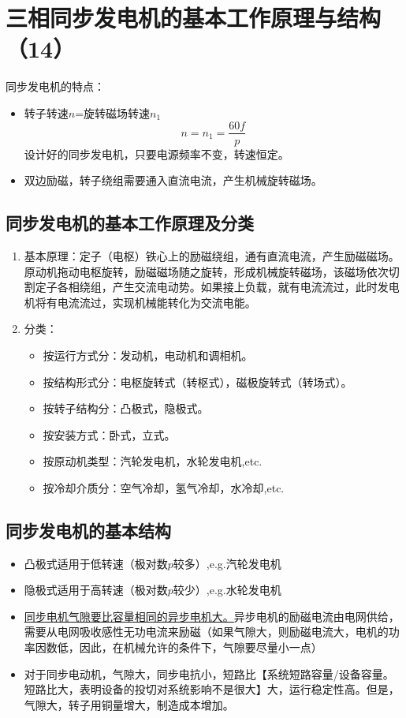 \documentclass[blue]{elegantnote}
\begin{document}
\chapter{三相同步发电机的基本工作原理与结构（14）}
同步发电机的特点：
\begin{itemize}
	\item  转子转速$n$=旋转磁场转速$n_1$
	$$n=n_1=\frac{60f}{p}$$
	设计好的同步发电机，只要电源频率不变，转速恒定。
	\item  {\color{thid}双边励磁}，转子绕组需要通入直流电流，产生机械旋转磁场。
\end{itemize}
\section{同步发电机的基本工作原理及分类}	
\begin{enumerate}
	\item 基本原理：{\color{blue}定子（电枢）}铁心上的励磁绕组，通有直流电流，产生励磁磁场。原动机拖动电枢旋转，励磁磁场随之旋转，形成机械旋转磁场，该磁场依次切割定子各相绕组，产生交流电动势。如果接上负载，就有电流流过，此时发电机将有电流流过，实现机械能转化为交流电能。
	\item 分类：
	\begin{itemize}
		\item 按运行方式分：发动机，电动机和调相机。
		\item 按结构形式分：电枢旋转式（转枢式），磁极旋转式（转场式）。
		\item 按转子结构分：凸极式，隐极式。
		\item 按安装方式：卧式，立式。
		\item 按原动机类型：汽轮发电机，水轮发电机,etc.
		\item 按冷却介质分：空气冷却，氢气冷却，水冷却,etc.
	\end{itemize}
\end{enumerate}
\section{同步发电机的基本结构}
\begin{itemize}
	\item 凸极式适用于低转速（极对数$p$较多）,e.g.汽轮发电机
	\item 隐极式适用于高转速（极对数$p$较少）,e.g.水轮发电机
	\item \underline{同步电机气隙要比容量相同的异步电机大。}异步电机的励磁电流由电网供给，需要从电网吸收感性无功电流来励磁（如果气隙大，则励磁电流大，电机的功率因数低，因此，在机械允许的条件下，气隙要尽量小一点）
	\item 对于同步电动机，气隙大，同步电抗小，短路比【系统短路容量/设备容量。短路比大，表明设备的投切对系统影响不是很大】大，运行稳定性高。{\color{thid}但是}，气隙大，转子用铜量增大，制造成本增加。
\end{itemize}
\end{document}

